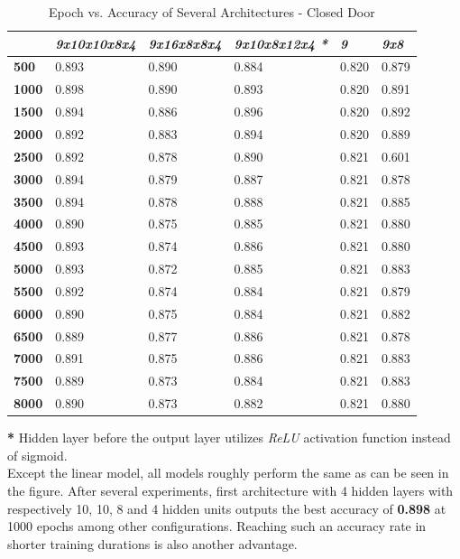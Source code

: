 \documentclass[conference]{IEEEtran}
\begin{document}
\begin{table}[H]
	\centering
	\caption{Epoch vs. Accuracy of Several Architectures - Closed Door}
	\label{AllArches}
	\begin{tabular}{|l|l|l|l|l|l|}
		\hline
		& \textit{9x10x10x8x4} 
		& \textit{9x16x8x8x4}
		& \textit{9x10x8x12x4 \textbf{*}}
		& \textit{9}
		& \textit{9x8}\\ \hline
		\textbf{500} & 0.893 & 0.890 & 0.884 & 0.820 & 0.879\\ \hline
		\textbf{1000} & \cellcolor{green!25}0.898 & 0.890 & 0.893 & 0.820 & 0.891\\
		\hline
		\textbf{1500} & 0.894 & 0.886 & 0.896 & 0.820 & 0.892\\ \hline
		\textbf{2000} & 0.892& 0.883 & 0.894 & 0.820 & 0.889\\ \hline
		\textbf{2500} & 0.892 & 0.878 & 0.890 &  0.821 & 0.601\\
		\hline
		\textbf{3000} & 0.894 & 0.879 & 0.887 & 0.821 & 0.878\\ \hline
		\textbf{3500} & 0.894 & 0.878 & 0.888 & 0.821 & 0.885\\ \hline
		\textbf{4000} & 0.890 & 0.875 & 0.885 & 0.821 & 0.880\\ \hline
		\textbf{4500} & 0.893 & 0.874 & 0.886 & 0.821 & 0.880\\ \hline
		\textbf{5000} & 0.893 &  0.872 & 0.885 & 0.821 & 0.883\\ \hline
		\textbf{5500} & 0.892 & 0.874 & 0.884 & 0.821 & 0.879\\ \hline
		\textbf{6000} & 0.890 & 0.875 & 0.884 & 0.821 & 0.882\\ \hline 
		\textbf{6500} & 0.889 & 0.877 & 0.886 & 0.821 & 0.878\\ \hline
		\textbf{7000} & 0.891 & 0.875 & 0.886 & 0.821 & 0.883\\ \hline 
		\textbf{7500} & 0.889 & 0.873 & 0.884 & 0.821 & 0.883\\ \hline
		\textbf{8000} & 0.890 & 0.873 & 0.882 & 0.821 & 0.880\\ \hline
	\end{tabular}
\end{table}
\indent\textbf{*} Hidden layer before the output layer utilizes \textit{ReLU} activation function instead of sigmoid.\\

Except the linear model, all models roughly perform the same as can be seen in the figure. After several experiments, first architecture with 4 hidden layers with respectively 10, 10, 8 and 4 hidden units outputs the best accuracy of \textbf{0.898} at 1000 epochs among other configurations. Reaching such an accuracy rate in shorter training durations is also another advantage.\\
\end{document}
